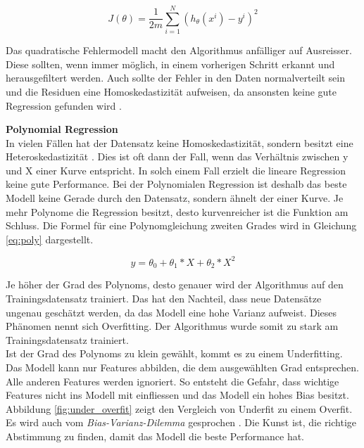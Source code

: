 \begin{equation}\label{eq:cost_function}
J(\theta) = \frac{1}{2m} \sum_{i=1}^{N} (h_\theta(x^i) - y^i)^2
\end{equation}

Das quadratische Fehlermodell macht den Algorithmus anfälliger auf Ausreisser. Diese sollten, wenn immer möglich, in einem vorherigen Schritt erkannt und herausgefiltert werden. Auch sollte der Fehler in den Daten normalverteilt sein und die Residuen eine Homoskedastizität aufweisen, da ansonsten keine gute Regression gefunden wird \cite{gradient_descent, gradient_descent_2, gradient_descent_3}.

\textbf{Polynomial Regression}\\
In vielen Fällen hat der Datensatz keine Homoskedastizität, sondern besitzt eine Heteroskedastizität \cite{poly}. Dies ist oft dann der Fall, wenn das Verhältnis zwischen y und X einer Kurve entspricht. In solch einem Fall erzielt die lineare Regression keine gute Performance.
Bei der Polynomialen Regression ist deshalb das beste Modell keine Gerade durch den Datensatz, sondern ähnelt der einer Kurve. Je mehr Polynome die Regression besitzt, desto kurvenreicher ist die Funktion am Schluss. Die Formel für eine Polynomgleichung zweiten Grades wird in Gleichung \eqref{eq:poly} dargestellt.

\begin{equation}\label{eq:poly}
y = \theta_0 + \theta_1 * X + \theta_2 * X^2
\end{equation}

Je höher der Grad des Polynoms, desto genauer wird der Algorithmus auf den Trainingsdatensatz trainiert. Das hat den Nachteil, dass neue Datensätze ungenau geschätzt werden, da das Modell eine hohe Varianz aufweist. Dieses Phänomen nennt sich Overfitting. Der Algorithmus wurde somit zu stark am Trainingsdatensatz trainiert.\\
Ist der Grad des Polynoms zu klein gewählt, kommt es zu einem Underfitting. Das Modell kann nur Features abbilden, die dem ausgewählten Grad entsprechen. Alle anderen Features werden ignoriert. So entsteht die Gefahr, dass wichtige Features nicht ins Modell mit einfliessen und das Modell ein hohes Bias besitzt. Abbildung \ref{fig:under_overfit} zeigt den Vergleich von Underfit zu einem Overfit.\\
Es wird auch vom \textit{Bias-Varianz-Dilemma} gesprochen \cite{bias_variance, bias_variance_2}. Die Kunst ist, die richtige Abstimmung zu finden, damit das Modell die beste Performance hat.

